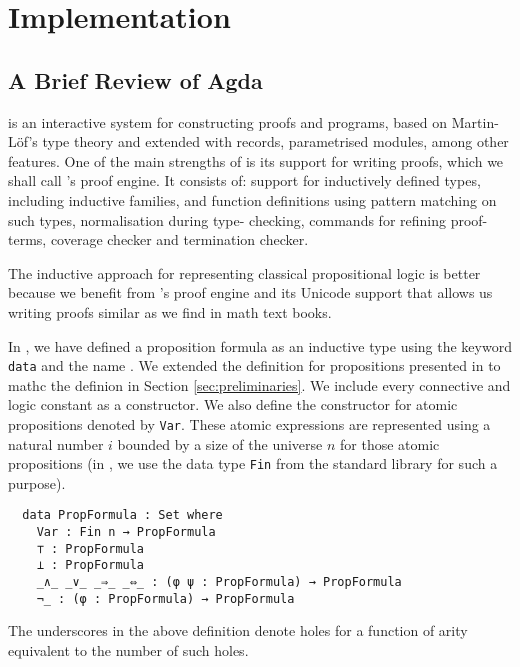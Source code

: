 \documentclass[../main.tex]{subfiles}
\begin{document}

\section{Implementation}
\label{sec:implementation}


\subsection{A Brief Review of Agda}
\label{ssec:agda-definition}

\Agda is an interactive system for constructing proofs and programs,
based on Martin-L\"{o}f's type theory and extended with records,
parametrised modules, among other features. One of the main
strengths of \Agda is its support for writing proofs, which we shall
call \Agda's proof engine. It consists of: support for inductively
defined types, including inductive families, and function
definitions using pattern matching on such types, normalisation
during type- checking, commands for refining proof-terms, coverage
checker and termination checker.

The inductive approach for representing classical propositional
logic is better because we benefit from \Agda's proof engine and its
Unicode support that allows us writing proofs similar as we find in
math text books.

In \Agda, we have defined a proposition formula
as an inductive type using the keyword \texttt{data} and the name
.
We extended the definition for propositions presented in
\cite{Altenkirch2015} to mathc the definion in Section
\ref{sec:preliminaries}.
We include every connective and logic constant as a constructor.
We also define the constructor for atomic propositions denoted by
\verb!Var!. These atomic expressions are represented using a natural
number $i$ bounded by a size of the universe $n$ for those atomic
propositions (in \Agda, we use the data type \verb!Fin! from the
standard  library for such a purpose).

\begin{verbatim}
  data PropFormula : Set where
    Var : Fin n → PropFormula
    ⊤ : PropFormula
    ⊥ : PropFormula
    _∧_ _∨_ _⇒_ _⇔_ : (φ ψ : PropFormula) → PropFormula
    ¬_ : (φ : PropFormula) → PropFormula
\end{verbatim}

\begin{myremark}
The underscores in the above definition denote holes for a function of arity equivalent to the number of such holes.
\end{myremark}
\end{document}

